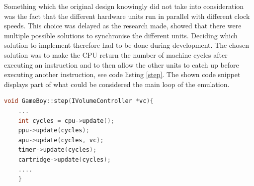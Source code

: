 


Something which the original design knowingly did not take into consideration was the fact that the different hardware units run in parallel with different clock speeds. This choice was delayed as the research made, showed that there were multiple possible solutions to synchronise the different units. Deciding which solution to implement therefore had to be done during development. The chosen solution was to make the CPU return the number of machine cycles after executing an instruction and to then allow the other units to catch up before executing another instruction, see code listing \ref{step}. The shown code snippet displays part of what could be considered the main loop of the emulation. 

\begin{lstlisting}[language=C++,
caption = {Code displaying how the CPU executes an instruction and returns the number of machine cycles, whereafter the other units catch up by executing the same number of cycles.},
label = {step}]
void GameBoy::step(IVolumeController *vc){
    ...
    int cycles = cpu->update();
    ppu->update(cycles);
    apu->update(cycles, vc);
    timer->update(cycles);
    cartridge->update(cycles);
    ....
    }
\end{lstlisting}


